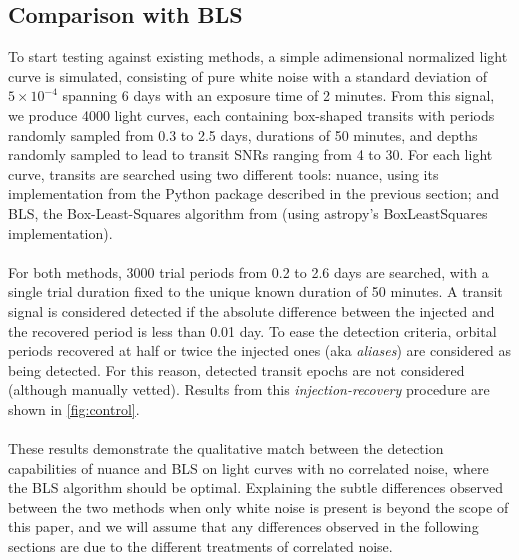\documentclass[modern]{aastex631}
\begin{document}
\subsection{Comparison with BLS}\label{control}

To start testing \nuancecode{} against existing methods, a simple adimensional normalized light curve is simulated, consisting of pure white noise with a standard deviation of $5\times 10^{-4}$ spanning 6 days with an exposure time of 2 minutes.
From this signal, we produce 4000 light curves, each containing box-shaped transits with periods randomly sampled from 0.3 to 2.5 days, durations of 50 minutes, and depths randomly sampled to lead to transit SNRs ranging from 4 to 30.
For each light curve, transits are searched using two different tools: \textsf{nuance}, using its implementation from the Python package described in the previous section; and BLS, the Box-Least-Squares algorithm from \cite{bls} (using \textsf{astropy}'s \textsf{BoxLeastSquares} implementation). \\\\
For both methods, 3000 trial periods from 0.2 to 2.6 days are searched, with a single trial duration fixed to the unique known duration of 50 minutes. A transit signal is considered detected if the absolute difference between the injected and the recovered period is less than 0.01 day. To ease the detection criteria, orbital periods recovered at half or twice the injected ones (aka \textit{aliases}) are considered as being detected. For this reason, detected transit epochs are not considered (although manually vetted). Results from this \textit{injection-recovery} procedure are shown in \autoref{fig:control}.\\\\
These results demonstrate the qualitative match between the detection capabilities of \textsf{nuance} and \textsf{BLS} on light curves with no correlated noise, where the BLS algorithm should be optimal. Explaining the subtle differences observed between the two methods when only white noise is present is beyond the scope of this paper, and we will assume that any differences observed in the following sections are due to the different treatments of correlated noise.
\end{document}
